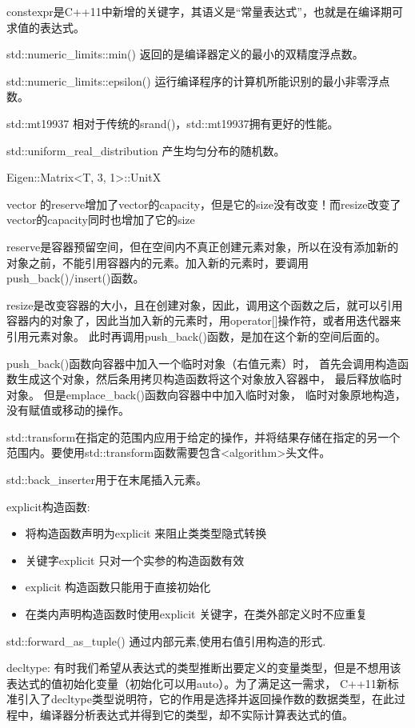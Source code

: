 

constexpr是C++11中新增的关键字，其语义是“常量表达式”，也就是在编译期可求值的表达式。

std::numeric\_limits::min() 返回的是编译器定义的最小的双精度浮点数。

std::numeric\_limits::epsilon() 运行编译程序的计算机所能识别的最小非零浮点数。

std::mt19937 相对于传统的srand()，std::mt19937拥有更好的性能。

std::uniform_real_distribution 产生均匀分布的随机数。



Eigen::Matrix<T, 3, 1>::UnitX 


vector 的reserve增加了vector的capacity，但是它的size没有改变！而resize改变了vector的capacity同时也增加了它的size

reserve是容器预留空间，但在空间内不真正创建元素对象，所以在没有添加新的对象之前，不能引用容器内的元素。加入新的元素时，要调用push_back()/insert()函数。

resize是改变容器的大小，且在创建对象，因此，调用这个函数之后，就可以引用容器内的对象了，因此当加入新的元素时，用operator[]操作符，或者用迭代器来引用元素对象。
此时再调用push_back()函数，是加在这个新的空间后面的。

push_back()函数向容器中加入一个临时对象（右值元素）时， 首先会调用构造函数生成这个对象，然后条用拷贝构造函数将这个对象放入容器中， 最后释放临时对象。
但是emplace_back()函数向容器中中加入临时对象， 临时对象原地构造，没有赋值或移动的操作。


std::transform在指定的范围内应用于给定的操作，并将结果存储在指定的另一个范围内。要使用std::transform函数需要包含<algorithm>头文件。

std::back_inserter用于在末尾插入元素。


explicit构造函数:

\begin{itemize}
  \item 将构造函数声明为explicit 来阻止类类型隐式转换
  \item 关键字explicit 只对一个实参的构造函数有效
  \item explicit 构造函数只能用于直接初始化
  \item 在类内声明构造函数时使用explicit 关键字，在类外部定义时不应重复
\end{itemize}

std::forward_as_tuple() 通过内部元素,使用右值引用构造的形式.

decltype: 有时我们希望从表达式的类型推断出要定义的变量类型，但是不想用该表达式的值初始化变量（初始化可以用auto）。为了满足这一需求，
C++11新标准引入了decltype类型说明符，它的作用是选择并返回操作数的数据类型，在此过程中，编译器分析表达式并得到它的类型，却不实际计算表达式的值。

